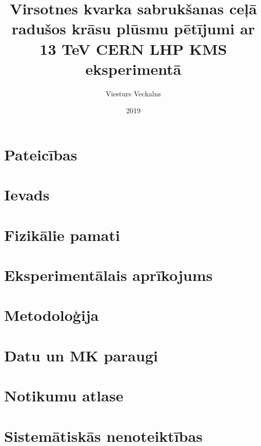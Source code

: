 \documentclass[titlepage, a4paper, LV]{mythesis}
\title{Virsotnes kvarka sabrukšanas ceļā radušos krāsu plūsmu pētījumi ar 13 TeV CERN LHP KMS eksperimentā}
\author{Viesturs Veckalns}
\date{2019}
\begin{document}
\maketitle
\begin{abstract}
        
\end{abstract}

\chapter*{Pateicības}
\label{chap:acknowledgements}


\tableofcontents
\printglossary[toctitle=Terminu tulkojumi, title=Latviešu-angļu terminu tulkojumi]

\chapter{Ievads}
\label{chap:introduction}


\chapter{Fizikālie pamati}


\chapter{Eksperimentālais aprīkojums}


\chapter{Metodoloģija}
\label{chap:methodology}


\chapter{Datu un MK paraugi}


\chapter{Notikumu atlase}
\label{chap:event_selection}


\chapter{Sistemātiskās nenoteiktības}
\label{chap:systematic_uncertainties}

\end{document}
